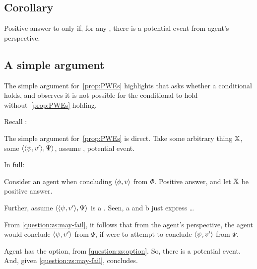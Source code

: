\subsection{Corollary}
\label{cha:zSpA:sec:corollary}

\begin{note}
  \begin{corollary}
    \label{corr:prop:PWEs}
    Positive answer to \qzS{} only if, for any \requ{}, there is a potential event from agent's perspective.
  \end{corollary}
\end{note}



\subsection{A simple argument}
\label{cha:zSpA:sec:simple-argument}

\begin{note}
  The simple argument for~\autoref{prop:PWEs} highlights that \qzS{} asks whether a conditional holds, and observes it is not possible for the conditional to hold without~\autoref{prop:PWEs} holding.

  Recall \qzS{}:
  \begin{quote}
    \questionZS*
  \end{quote}
\end{note}

\begin{note}
  The simple argument for~\autoref{prop:PWEs} is direct.
  Take some arbitrary thing \(\qzSaV{}\), some \(\pvp{\psi}{v'}{\Psi}\), assume \requ{}, potential event.

  In full:

  Consider an agent when concluding \(\pv{\phi}{v}\) from \(\Phi\).
  Positive answer, and let \(\qzSaV{}\) be positive answer.

  Further, assume \(\pvp{\psi}{v'}{\Psi}\) is a \requ{}.
  { \color{red} Seen, a and b just express \requ{}\dots}

  From \qzS{} \ref{question:zs:may-fail}, it follows that from the agent's perspective, the agent would conclude \(\pv{\psi}{v'}\) from \(\Psi\), if \vAgent{} were to attempt to conclude \(\pv{\psi}{v'}\) from \(\Psi\).

  Agent has the option, from \ref{question:zs:option}.
  So, there is a potential event.
  And, given \ref{question:zs:may-fail}, concludes.
\end{note}

